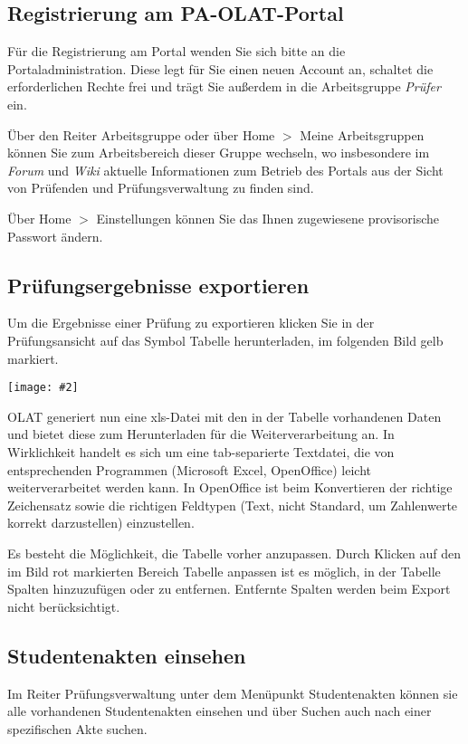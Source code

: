 \documentclass[a4paper,11pt]{article}
\newcommand{\bild}[2]{
    \begin{center}\texttt{[image: \#2]}\end{center}
}
\newcommand{\knopf}[1]{{\sc #1}}
\begin{document}
\subsection{Registrierung am PA-OLAT-Portal}

Für die Registrierung am Portal wenden Sie sich bitte an die
Portaladministration. Diese legt für Sie einen neuen Account an, schaltet die
erforderlichen Rechte frei und trägt Sie außerdem in die Arbeitsgruppe {\em
  Prüfer} ein.

Über den Reiter \knopf{Arbeitsgruppe} oder über \knopf{Home $>$ Meine
  Arbeitsgruppen} können Sie zum Arbeitsbereich dieser Gruppe wechseln, wo
insbesondere im {\em Forum} und {\em Wiki} aktuelle Informationen zum Betrieb
des Portals aus der Sicht von Prüfenden und Prüfungsverwaltung zu finden sind.

Über \knopf{Home $>$ Einstellungen} können Sie das Ihnen zugewiesene
provisorische Passwort ändern.

\subsection{Prüfungsergebnisse exportieren}

Um die Ergebnisse einer Prüfung zu exportieren klicken Sie in der
Prüfungsansicht auf das Symbol \knopf{Tabelle herunterladen}, im folgenden
Bild gelb markiert.

\bild{1}{Ergebnis-Exportieren}

OLAT generiert nun eine xls-Datei mit den in der Tabelle vorhandenen Daten und
bietet diese zum Herunterladen für die Weiterverarbeitung an.  In Wirklichkeit
handelt es sich um eine tab-separierte Textdatei, die von entsprechenden
Programmen (Microsoft Excel, OpenOffice) leicht weiterverarbeitet werden kann.
In OpenOffice ist beim Konvertieren der richtige Zeichensatz sowie die
richtigen Feldtypen (Text, nicht Standard, um Zahlenwerte korrekt
darzustellen) einzustellen.

Es besteht die Möglichkeit, die Tabelle vorher anzupassen. Durch Klicken auf
den im Bild rot markierten Bereich \knopf{Tabelle anpassen} ist es möglich, in
der Tabelle Spalten hinzuzufügen oder zu entfernen. Entfernte Spalten werden
beim Export nicht berücksichtigt.

\subsection{Studentenakten einsehen}

Im Reiter \knopf{Prüfungsverwaltung} unter dem Menüpunkt \knopf{Studentenakten}
können sie alle vorhandenen Studentenakten einsehen und über
\knopf{Suchen} auch nach einer spezifischen Akte suchen.
\end{document}

